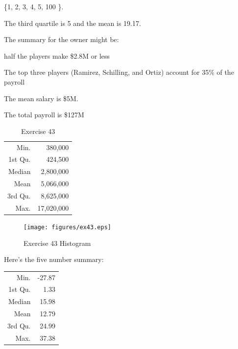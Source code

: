 \documentclass{exam}
\begin{document}
\begin{description}
        \{1, 2, 3, 4, 5, 100 \}.  
        
        The third quartile is 5 and the mean is 19.17.

      \item[43]

        The summary for the owner might be:
        \begin{itemize*}
          \item half the players make \$2.8M or less
          \item The top three players (Ramirez, Schilling, and Ortiz) account
            for 35\% of the payroll
          \item The mean salary is \$5M.
          \item The total payroll is \$127M
        \end{itemize*}

        \begin{table}[H]
          \centering
          \begin{tabular}{rr}
            \toprule
            Min.    & 380,000 \\
            1st Qu. & 424,500 \\
            Median  & 2,800,000 \\
            Mean    & 5,066,000 \\
            3rd Qu. & 8,625,000 \\
            Max.    & 17,020,000 \\
            \bottomrule
          \end{tabular}
          \caption{Exercise 43}
        \end{table}
        \begin{figure}[H]
          \centering
          \texttt{[image: figures/ex43.eps]}
          \caption{Exercise 43 Histogram}
        \end{figure}


      \item[44]
        Here's the five number summary:

        \begin{table}[H]
          \centering
          \begin{tabular}{rr}
            \toprule
            Min.    & -27.87 \\
            1st Qu. & 1.33 \\
            Median  & 15.98 \\
            Mean    & 12.79 \\
            3rd Qu. & 24.99 \\
            Max.    & 37.38 \\
            \bottomrule
          \end{tabular}
        \end{table}


\end{description}
\end{document}
